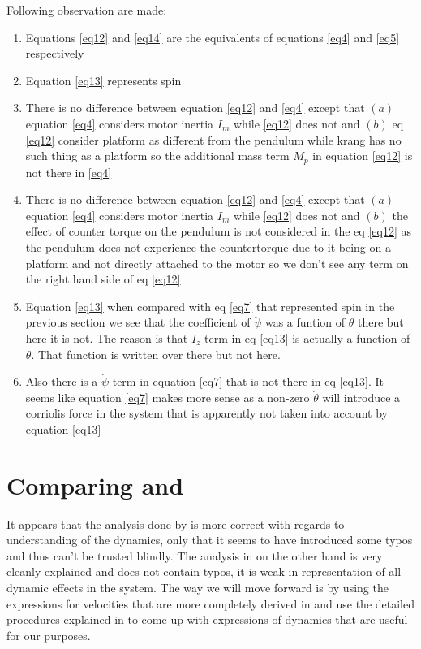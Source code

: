 \documentclass[a4paper,10pt]{article}
\begin{document}
Following observation are made:
\begin{enumerate}[label=(\roman*)]
 \item Equations \ref{eq12} and \ref{eq14} are the equivalents of equations \ref{eq4} and \ref{eq5} respectively
 \item Equation \ref{eq13} represents spin
 \item There is no difference between equation \ref{eq12} and \ref{eq4} except that $(a)$ equation \ref{eq4} considers
 motor inertia $I_m$ while \ref{eq12} does not and $(b)$ eq \ref{eq12} consider platform as different from the pendulum while 
 krang has no such thing as a platform so the additional mass term $M_p$ in equation \ref{eq12} is not there in \ref{eq4}
 \item There is no difference between equation \ref{eq12} and \ref{eq4} except that $(a)$ equation \ref{eq4} considers
 motor inertia $I_m$ while \ref{eq12} does not and $(b)$ the effect of counter torque on the pendulum is not considered
 in the eq \ref{eq12} as the pendulum does not experience the countertorque due to it being on a platform and not 
 directly attached to the motor so we don't see any term on the right hand side of eq \ref{eq12}
 \item Equation \ref{eq13} when compared with eq \ref{eq7} that represented spin in the previous section we see that
 the coefficient of $\ddot{\psi}$ was a funtion of $\theta$ there but here it is not. The reason is that $I_z$ term
 in eq \ref{eq13} is actually a function of $\theta$. That function is written over there but not here.
 \item Also there is a $\dot{\psi}$ term in equation \ref{eq7} that is not there in eq \ref{eq13}. It seems like equation \ref{eq7}
 makes more sense as a non-zero $\dot{\theta}$ will introduce a corriolis force in the system that is apparently not taken into
 account by equation \ref{eq13}
\end{enumerate}

\section{Comparing \cite{kim2005dynamic} and \cite{li2012advanced}}

It appears that the analysis done by \cite{kim2005dynamic} is more correct with regards to understanding of the dynamics,
only that it seems to have introduced some typos and thus can't be trusted blindly. The analysis in \cite{li2012advanced}
on the other hand is very cleanly explained and does not contain typos, it is weak in representation of all dynamic effects
in the system. The way we will move forward is by using the expressions for velocities that are more completely derived
in \cite{kim2005dynamic} and use the detailed procedures explained in \cite{li2012advanced} to come up with expressions
of dynamics that are useful for our purposes.
\end{document}
